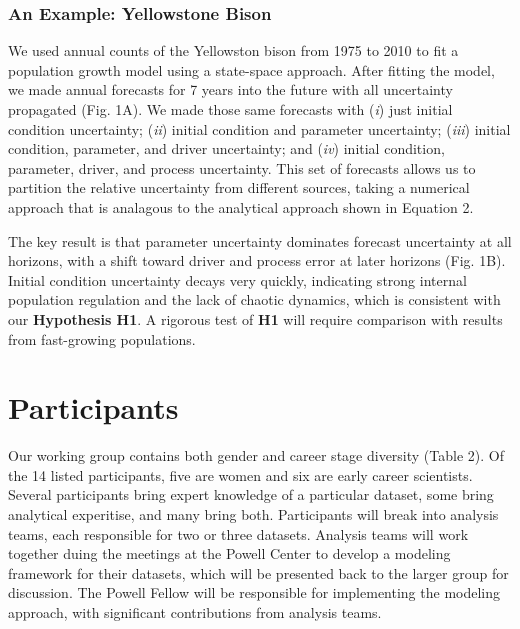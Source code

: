 \documentclass[12pt,]{article}
\begin{document}
\subsubsection{An Example: Yellowstone Bison}

We used annual counts of the Yellowston bison from 1975 to 2010 to fit a
population growth model using a state-space approach. After fitting the
model, we made annual forecasts for 7 years into the future with all
uncertainty propagated (Fig. 1A). We made those same forecasts with
(\emph{i}) just initial condition uncertainty; (\emph{ii}) initial
condition and parameter uncertainty; (\emph{iii}) initial condition,
parameter, and driver uncertainty; and (\emph{iv}) initial condition,
parameter, driver, and process uncertainty. This set of forecasts allows
us to partition the relative uncertainty from different sources, taking
a numerical approach that is analagous to the analytical approach shown
in Equation 2.

The key result is that parameter uncertainty dominates forecast
uncertainty at all horizons, with a shift toward driver and process
error at later horizons (Fig. 1B). Initial condition uncertainty decays
very quickly, indicating strong internal population regulation and the
lack of chaotic dynamics, which is consistent with our
\textbf{Hypothesis H1}. A rigorous test of \textbf{H1} will require
comparison with results from fast-growing populations.

\section{Participants}

Our working group contains both gender and career stage diversity (Table
2). Of the 14 listed participants, five are women and six are early
career scientists. Several participants bring expert knowledge of a
particular dataset, some bring analytical experitise, and many bring
both. Participants will break into analysis teams, each responsible for
two or three datasets. Analysis teams will work together duing the
meetings at the Powell Center to develop a modeling framework for their
datasets, which will be presented back to the larger group for
discussion. The Powell Fellow will be responsible for implementing the
modeling approach, with significant contributions from analysis teams.

\footnotesize
\end{document}
